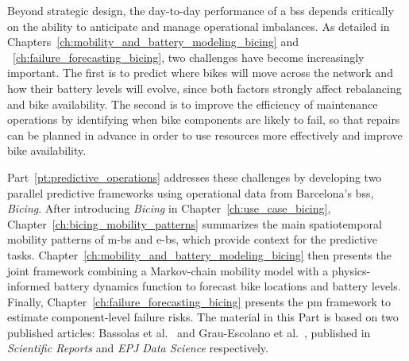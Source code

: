 Beyond strategic design, the day-to-day performance of a \ac{bss} depends critically on the ability to anticipate and manage operational imbalances. As detailed in Chapters~\ref{ch:mobility_and_battery_modeling_bicing} and ~\ref{ch:failure_forecasting_bicing}, two challenges have become increasingly important. The first is to predict where bikes will move across the network and how their battery levels will evolve, since both factors strongly affect rebalancing and bike availability. The second is to improve the efficiency of maintenance operations by identifying when bike components are likely to fail, so that repairs can be planned in advance in order to use resources more effectively and improve bike availability.

Part~\ref{pt:predictive_operations} addresses these challenges by developing two parallel predictive frameworks using operational data from Barcelona’s \ac{bss}, \textit{Bicing}. After introducing \textit{Bicing} in Chapter~\ref{ch:use_case_bicing}, Chapter~\ref{ch:bicing_mobility_patterns} summarizes the main spatiotemporal mobility patterns of \acp{m-b} and \acp{e-b}, which provide context for the predictive tasks. Chapter~\ref{ch:mobility_and_battery_modeling_bicing} then presents the joint framework combining a Markov-chain mobility model with a physics-informed battery dynamics function to forecast bike locations and battery levels. Finally, Chapter~\ref{ch:failure_forecasting_bicing} presents the \ac{pm} framework to estimate component-level failure risks. The material in this Part is based on two published articles: Bassolas et al.~\cite{Bassolas2025} and Grau-Escolano et al.~\cite{Grau-Escolano2024}, published in \textit{Scientific Reports} and \textit{EPJ Data Science} respectively.


